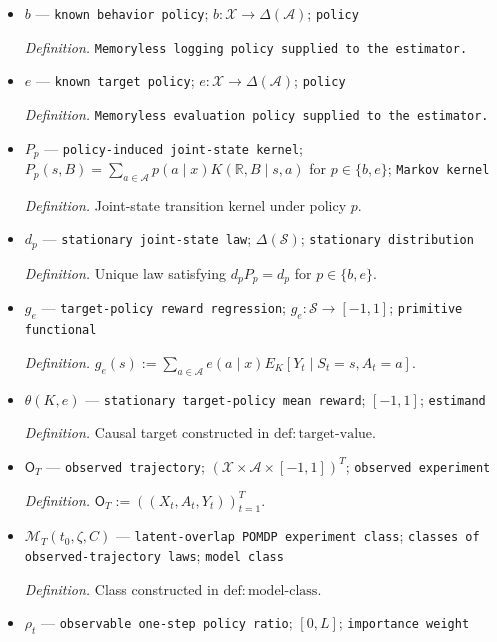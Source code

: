 \documentclass{article}
\begin{document}
\begin{itemize}
  \item \(b\) --- \texttt{known behavior policy}; \(b:\mathcal X\to\Delta(\mathcal A)\); \texttt{policy}
  \par\smallskip\noindent\emph{Definition.} \texttt{Memoryless logging policy supplied to the estimator.}
  \item \(e\) --- \texttt{known target policy}; \(e:\mathcal X\to\Delta(\mathcal A)\); \texttt{policy}
  \par\smallskip\noindent\emph{Definition.} \texttt{Memoryless evaluation policy supplied to the estimator.}
  \item \(P_p\) --- \texttt{policy-\allowbreak{}induced joint-\allowbreak{}state kernel}; \(P_p(s,B)=\sum_{a\in\mathcal A}p(a\mid x)K(\mathbb R,B\mid s,a)\) for \(p\in\{b,e\}\); \texttt{Markov kernel}
  \par\smallskip\noindent\emph{Definition.} Joint-state transition kernel under policy \(p\).
  \item \(d_p\) --- \texttt{stationary joint-\allowbreak{}state law}; \(\Delta(\mathcal S)\); \texttt{stationary distribution}
  \par\smallskip\noindent\emph{Definition.} Unique law satisfying \(d_pP_p=d_p\) for \(p\in\{b,e\}\).
  \item \(g_e\) --- \texttt{target-\allowbreak{}policy reward regression}; \(g_e:\mathcal S\to[-1,1]\); \texttt{primitive functional}
  \par\smallskip\noindent\emph{Definition.} \(g_e(s):=\sum_{a\in\mathcal A}e(a\mid x)E_K[Y_t\mid S_t=s,A_t=a]\).
  \item \(\theta(K,e)\) --- \texttt{stationary target-\allowbreak{}policy mean reward}; \([-1,1]\); \texttt{estimand}
  \par\smallskip\noindent\emph{Definition.} Causal target constructed in \(\mathrm{def{:}target\text{-}value}\).
  \item \(\mathsf O_T\) --- \texttt{observed trajectory}; \((\mathcal X\times\mathcal A\times[-1,1])^T\); \texttt{observed experiment}
  \par\smallskip\noindent\emph{Definition.} \(\mathsf O_T:=((X_t,A_t,Y_t))_{t=1}^T\).
  \item \(\mathcal M_T(t_0,\zeta,C)\) --- \texttt{latent-\allowbreak{}overlap POMDP experiment class}; \texttt{classes of observed-\allowbreak{}trajectory laws}; \texttt{model class}
  \par\smallskip\noindent\emph{Definition.} Class constructed in \(\mathrm{def{:}model\text{-}class}\).
  \item \(\rho_t\) --- \texttt{observable one-\allowbreak{}step policy ratio}; \([0,L]\); \texttt{importance weight}

\end{itemize}
\end{document}

